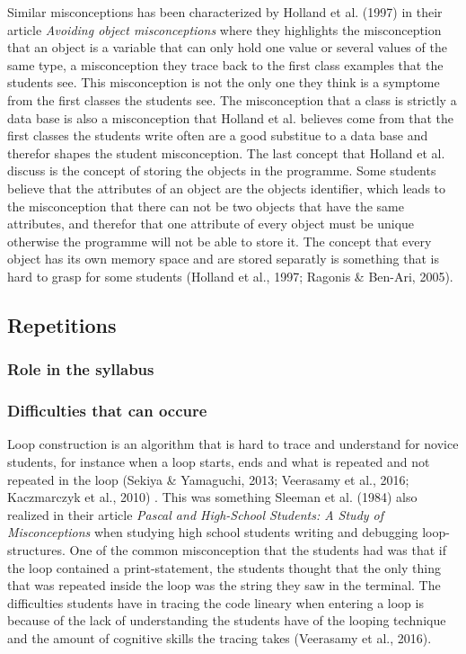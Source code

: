 \documentclass[twocolumn]{article}
\begin{document}
Similar misconceptions has been characterized by Holland et al. (1997) in their article \emph{Avoiding object misconceptions} where they highlights the misconception that an object is a variable that can only hold one value or several values of the same type, a misconception they trace back to the first class examples that the students see. This misconception is not the only one they think is a symptome from the first classes the students see. The misconception that a class is strictly a data base is also a misconception that Holland et al. believes come from that the first classes the students write often are a good substitue to a data base and therefor shapes the student misconception. The last concept that Holland et al. discuss is the concept of storing the objects in the programme. Some students believe that the attributes of an object are the objects identifier, which leads to the misconception that there can not be two objects that have the same attributes, and therefor that one attribute of every object must be unique otherwise the programme will not be able to store it. The concept that every object has its own memory space and are stored separatly is something that is hard to grasp for some students (Holland et al., 1997; Ragonis \& Ben-Ari, 2005). 

\subsection{Repetitions}

\subsubsection{Role in the syllabus}

\subsubsection{Difficulties that can occure}

Loop construction is an algorithm that is hard to trace and understand for novice students, for instance when a loop starts, ends and what is repeated and not repeated in the loop (Sekiya \& Yamaguchi, 2013; Veerasamy et al., 2016; Kaczmarczyk et al., 2010) . This was something Sleeman et al. (1984) also realized in their article \emph{Pascal and High-School Students: A Study of Misconceptions} when studying high school students writing and debugging loop-structures. One of the common misconception that the students had was that if the loop contained a print-statement, the students thought that the only thing that was repeated inside the loop was the string they saw in the terminal. The difficulties students have in tracing the code lineary when entering a loop is because of the lack of understanding the students have of the looping technique and the amount of cognitive skills the tracing takes (Veerasamy et al., 2016). 
\end{document}
